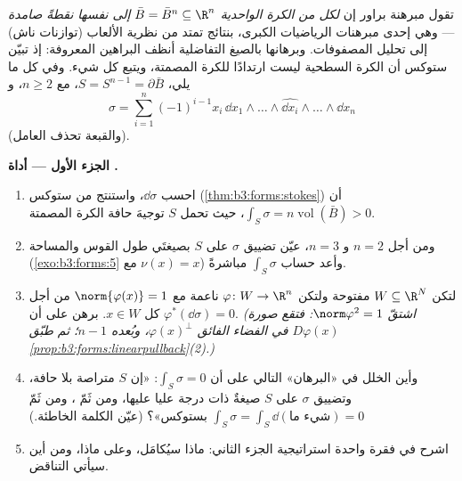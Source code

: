 \begin{problem}\label{pb:b3:forms:1}
تقول مبرهنة براور إن \emph{لكل  من الكرة الواحدية
 $\bar B = \bar B^n \subseteq \R^n$ إلى نفسها نقطةً صامدة} --- وهي إحدى مبرهنات
الرياضيات الكبرى، بنتائج تمتد من نظرية الألعاب (توازنات ناش)
إلى تحليل المصفوفات. وبرهانها بالصيغ التفاضلية أنظف البراهين
المعروفة: إذ تبيّن ستوكس أن الكرة السطحية ليست ارتدادًا للكرة
المصمتة، ويتبع كل شيء. وفي كل ما يلي، $S = S^{n-1} = \partial\bar B$، مع $n \geq 2$،
و
\[
\sigma = \sum_{i=1}^n(-1)^{i-1}x_i\,
\dd x_1\wedge\dots\wedge\widehat{\dd x_i}\wedge\dots\wedge
\dd x_n
\]
(والقبعة تحذف العامل).

\medskip
\noindent\textbf{الجزء الأول --- أداة .}
\begin{enumerate}
  \item احسب $\dd\sigma$، واستنتج من ستوكس (\cref{thm:b3:forms:stokes}) أن
        $\int_S\sigma =
        n\operatorname{vol}(\bar B) > 0$، حيث تحمل $S$ توجيهَ حافة الكرة المصمتة.
  \item ومن أجل $n = 2$ و $n = 3$، عيّن تضييق $\sigma$ على $S$
        بصيغتَي طول القوس والمساحة (\cref{exo:b3:forms:5} مع
        $\nu(x) = x$) وأعد حساب $\int_S\sigma$ مباشرةً.
  \item لتكن $W \subseteq \R^N$ مفتوحة ولتكن $\varphi\colon W
        \to \R^n$ ناعمة مع $\norm{\varphi(x)} = 1$ من
        أجل كل $x \in W$. برهن على أن $\varphi^*(\dd\sigma) = 0$. \emph{(اشتقّ
        $\norm\varphi^2 = 1$: فتقع صورة $D\varphi(x)$ في الفضاء الفائق
        $\varphi(x)^\perp$، وبُعده $n - 1$؛ ثم طبّق \cref{prop:b3:forms:linearpullback}(2).)}
  \item وأين الخلل في «البرهان» التالي على أن $\int_S\sigma = 0$: «إن $S$
        متراصة بلا حافة، وتضييق $\sigma$ على $S$ صيغةٌ ذات
        درجة عليا عليها، ومن ثَمّ ، ومن ثَمّ $\int_S\sigma =
        \int_S\dd(\text{شيء ما}) = 0$
        بستوكس»؟ (عيّن الكلمة الخاطئة.)
  \item اشرح في فقرة واحدة استراتيجية الجزء الثاني: ماذا
        سيُكامَل، وعلى ماذا، ومن أين سيأتي التناقض.
\end{enumerate}


\end{problem}
